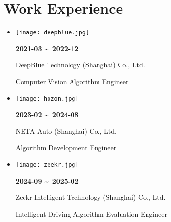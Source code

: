 \documentclass[11pt,a4paper]{article}
\begin{document}
\section*{Work Experience}
\begin{itemize}[leftmargin=*,noitemsep,topsep=3pt]
    \item 
    \begin{minipage}[c]{0.1\textwidth}
        \texttt{[image: deepblue.jpg]}
    \end{minipage}%
    \hspace{0.5em}%
    \begin{minipage}[c]{0.18\textwidth}
        \textbf{2021-03 \textasciitilde\ 2022-12}
    \end{minipage}%
    \begin{minipage}[c]{0.45\textwidth}
        DeepBlue Technology (Shanghai) Co., Ltd.
    \end{minipage}%
    \hfill%
    \begin{minipage}[c]{0.25\textwidth}
        \raggedleft Computer Vision Algorithm Engineer
    \end{minipage}
    
    \item 
    \begin{minipage}[c]{0.1\textwidth}
        \texttt{[image: hozon.jpg]}
    \end{minipage}%
    \hspace{0.5em}%
    \begin{minipage}[c]{0.18\textwidth}
        \textbf{2023-02 \textasciitilde\ 2024-08}
    \end{minipage}%
    \begin{minipage}[c]{0.45\textwidth}
        NETA Auto (Shanghai) Co., Ltd.
    \end{minipage}%
    \hfill%
    \begin{minipage}[c]{0.25\textwidth}
        \raggedleft Algorithm Development Engineer
    \end{minipage}
    
    \item 
    \begin{minipage}[c]{0.1\textwidth}
        \texttt{[image: zeekr.jpg]}
    \end{minipage}%
    \hspace{0.5em}%
    \begin{minipage}[c]{0.18\textwidth}
        \textbf{2024-09 \textasciitilde\ 2025-02}
    \end{minipage}%
    \begin{minipage}[c]{0.35\textwidth}
        Zeekr Intelligent Technology (Shanghai) Co., Ltd.
    \end{minipage}%
    \hfill%
    \begin{minipage}[c]{0.35\textwidth}
        \raggedleft Intelligent Driving Algorithm Evaluation Engineer
    \end{minipage}
\end{itemize}
\end{document}
